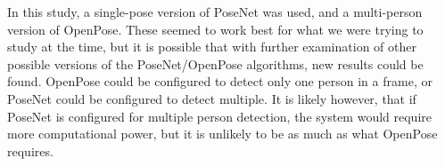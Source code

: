 In this study, a single-pose version of PoseNet was used, and a multi-person version of OpenPose. These seemed to work best for what we were trying to study at the time, but it is possible that with further examination of other possible versions of the PoseNet/OpenPose algorithms, new results could be found. OpenPose could be configured to detect only one person in a frame, or PoseNet could be configured to detect multiple. It is likely however, that if PoseNet is configured for multiple person detection, the system would require more computational power, but it is unlikely to be as much as what OpenPose requires.

